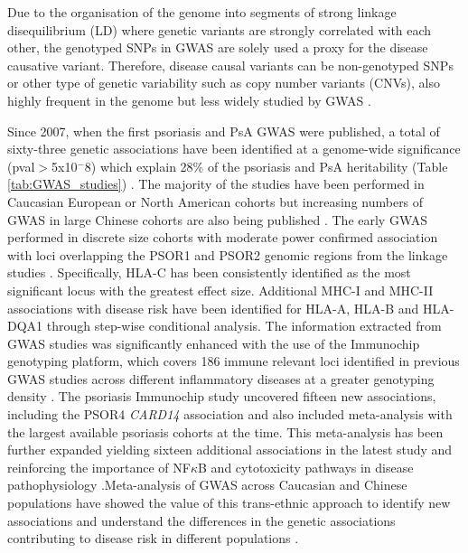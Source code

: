 Due to the organisation of the genome into segments of strong linkage disequilibrium (LD) where genetic variants are strongly correlated with each other, the genotyped SNPs in GWAS are solely used a proxy for the disease causative variant. Therefore, disease causal variants can be non-genotyped SNPs or other type of genetic variability such as copy number variants (CNVs), also highly frequent in the genome but less widely studied by GWAS \parencite{Hirschhorn2005, Ku2010}. 

Since 2007, when the first psoriasis and PsA GWAS were published, a total of sixty-three genetic associations have been identified at a genome-wide significance (pval$>$5x10$^-8$) which explain 28\% of the psoriasis and PsA heritability (Table \ref{tab:GWAS_studies}) \parencite{Tsoi2017}. The majority of the studies have been performed in Caucasian European or North American cohorts but increasing numbers of GWAS in large Chinese cohorts are also being published \parencite{Zhang2009, Sun2010, Yin2015}. The early GWAS performed in discrete size cohorts with moderate power confirmed association with loci overlapping the PSOR1 and PSOR2 genomic regions from the linkage studies \parencite{Cargill2007,Strange2010}. Specifically, HLA-C has been consistently identified as the most significant locus with the greatest effect size. Additional MHC-I and MHC-II associations with disease risk have been identified for HLA-A, HLA-B and HLA-DQA1 through step-wise conditional analysis\parencite{Okada2014}. 
The information extracted from GWAS studies was significantly enhanced with the use of the Immunochip genotyping platform, which covers 186 immune relevant loci identified in previous GWAS studies across different inflammatory diseases at a greater genotyping density \parencite{Tsoi2012}. The psoriasis Immunochip study uncovered fifteen new associations, including the PSOR4 \textit{CARD14} association and also included meta-analysis with the largest available psoriasis cohorts at the time\parencite{Tsoi2012}. This meta-analysis has been further expanded yielding sixteen additional associations in the latest study and reinforcing the importance of NF$\kappa$B and cytotoxicity pathways in disease pathophysiology \parencite{Tsoi2015,Tsoi2017}.Meta-analysis of GWAS across Caucasian and Chinese populations have showed the value of this trans-ethnic approach to identify new associations and understand the differences in the genetic associations contributing to disease risk in different populations \parencite{Yin2015}. %
